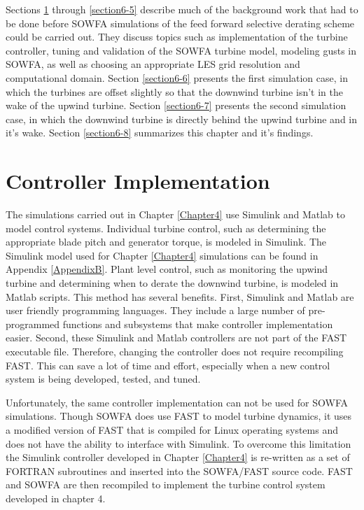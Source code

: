 Sections \ref{section6-2} through \ref{section6-5} describe much of the background work that had to be done before SOWFA simulations of the feed forward selective derating scheme could be carried out. They discuss topics such as implementation of the turbine controller, tuning and validation of the SOWFA turbine model, modeling gusts in SOWFA, as well as choosing an appropriate LES grid resolution and computational domain. Section \ref{section6-6} presents the first simulation case, in which the turbines are offset slightly so that the downwind turbine isn't in the wake of the upwind turbine. Section \ref{section6-7} presents the second simulation case, in which the downwind turbine is directly behind the upwind turbine and in it's wake. Section \ref{section6-8} summarizes this chapter and it's findings.




\section{Controller Implementation} \label{section6-2}

The simulations carried out in Chapter \ref{Chapter4} use Simulink and Matlab to model control systems. Individual turbine control, such as determining the appropriate blade pitch and generator torque, is modeled in Simulink. The Simulink model used for Chapter \ref{Chapter4} simulations can be found in Appendix \ref{AppendixB}. Plant level control, such as monitoring the upwind turbine and determining when to derate the downwind turbine, is modeled in Matlab scripts. This method has several benefits. First, Simulink and Matlab are user friendly programming languages.  They include a large number of pre-programmed functions and subsystems that make controller implementation easier. Second, these Simulink and Matlab controllers are not part of the FAST executable file. Therefore, changing the controller does not require recompiling FAST. This can save a lot of time and effort, especially when a new control system is being developed, tested, and tuned. 

Unfortunately, the same controller implementation can not be used for SOWFA simulations. Though SOWFA does use FAST to model turbine dynamics, it uses a modified version of FAST that is compiled for Linux operating systems and does not have the ability to interface with Simulink. To overcome this limitation the Simulink controller developed in Chapter \ref{Chapter4} is re-written as a set of FORTRAN subroutines and inserted into the SOWFA/FAST source code. FAST and SOWFA are then recompiled to implement the turbine control system developed in chapter 4. 


